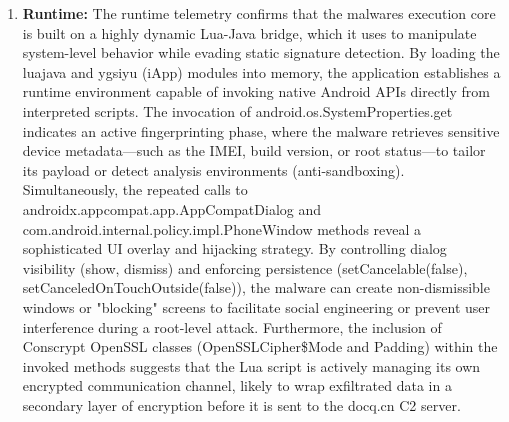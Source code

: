 \documentclass[
]{article}
\newenvironment{Shaded}{}{}
\newcommand{\NormalTok}[1]{#1}
\begin{document}
\begin{enumerate}
\def\labelenumi{\arabic{enumi}.}
\item
  \textbf{Runtime:} The runtime telemetry confirms that the
  malware\textquotesingle s execution core is built on a highly dynamic
  Lua-Java bridge, which it uses to manipulate system-level behavior
  while evading static signature detection. By loading the luajava and
  ygsiyu (iApp) modules into memory, the application establishes a
  runtime environment capable of invoking native Android APIs directly
  from interpreted scripts. The invocation of
  android.os.SystemProperties.get indicates an active fingerprinting
  phase, where the malware retrieves sensitive device metadata---such as
  the IMEI, build version, or root status---to tailor its payload or
  detect analysis environments (anti-sandboxing). Simultaneously, the
  repeated calls to androidx.appcompat.app.AppCompatDialog and
  com.android.internal.policy.impl.PhoneWindow methods reveal a
  sophisticated UI overlay and hijacking strategy. By controlling dialog
  visibility (show, dismiss) and enforcing persistence
  (setCancelable(false), setCanceledOnTouchOutside(false)), the malware
  can create non-dismissible windows or "blocking" screens to facilitate
  social engineering or prevent user interference during a root-level
  attack. Furthermore, the inclusion of Conscrypt OpenSSL classes
  (OpenSSLCipher\$Mode and Padding) within the invoked methods suggests
  that the Lua script is actively managing its own encrypted
  communication channel, likely to wrap exfiltrated data in a secondary
  layer of encryption before it is sent to the docq.cn C2 server.
\end{enumerate}

\begin{Shaded}
\end{Shaded}
\end{document}
